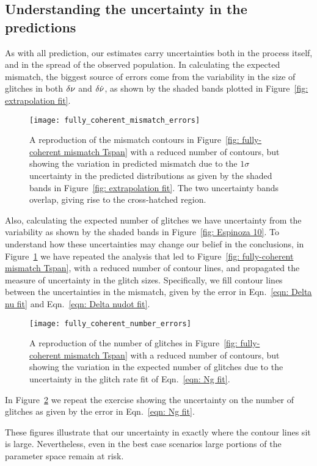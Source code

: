 \documentclass[../full_thesis/full_thesis.tex]{subfiles}
\begin{document}
\begin{subappendices}
\section{Understanding the uncertainty in the predictions}
\label{sec: uncertainties}

As with all prediction, our estimates carry uncertainties both in the process
itself, and in the spread of the observed population. In calculating the
expected mismatch, the biggest source of errors come from the variability in
the size of glitches in both $\delta\nu$ and $\delta\dot{\nu}$, as shown by the
shaded bands plotted in Figure~\ref{fig: extrapolation fit}.
\begin{figure}[htb]
\centering
\texttt{[image: fully\_coherent\_mismatch\_errors]}
\caption{A reproduction of the mismatch contours in Figure~\ref{fig:
fully-coherent mismatch Tspan} with a
reduced number of contours, but showing the variation in predicted mismatch
due to the $1\sigma$ uncertainty in the predicted distributions as given by
the shaded bands in Figure~\ref{fig: extrapolation fit}. The two uncertainty
bands overlap, giving rise to the cross-hatched region.}
\label{fig: fully-coherent mismatch Tspan errors}
\end{figure}
Also, calculating the expected number of glitches we have
uncertainty from the variability as shown by the shaded bands in Figure~\ref{fig:
Espinoza 10}. To understand how these uncertainties may change our belief in
the conclusions, in Figure~\ref{fig: fully-coherent mismatch Tspan errors} we have
repeated the analysis that led to Figure~\ref{fig: fully-coherent mismatch Tspan},
with a reduced number of
contour lines, and propagated the measure of uncertainty in the glitch sizes.
Specifically, we fill contour lines between the uncertainties in the mismatch, given by
the error in Eqn.~\eqref{eqn: Delta nu fit} and
Eqn.~\eqref{eqn: Delta nudot fit}.
\begin{figure}[htb]
\centering
\texttt{[image: fully\_coherent\_number\_errors]}
\caption{A reproduction of the number of glitches in Figure~\ref{fig:
fully-coherent mismatch Tspan} with a
reduced number of contours, but showing the variation in the expected number
of glitches due to the uncertainty in the glitch rate fit of Eqn.~\eqref{eqn:
Ng fit}.}
\label{fig: fully-coherent number Tspan errors}
\end{figure}
In Figure~\ref{fig: fully-coherent number Tspan errors}
we repeat the exercise showing the uncertainty on the number of glitches as
given by the error in Eqn.~\eqref{eqn: Ng fit}.

These figures illustrate that our uncertainty in exactly where the contour lines
sit is large. Nevertheless, even in the best case scenarios large portions of the
parameter space remain at risk.
\end{subappendices}

\biblio
\end{document}

